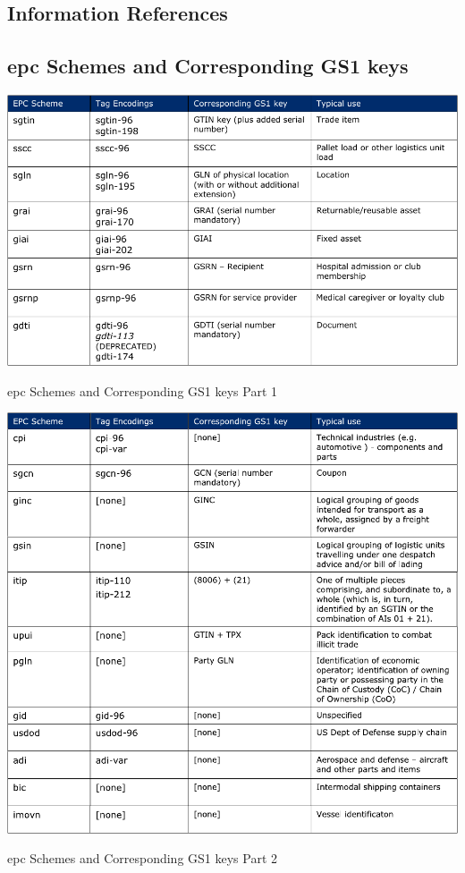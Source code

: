 \renewcommand{\thesection}{\Alph{section}}

\begin{appendices}
\chapter{Information References}

\section{\ac{epc} Schemes and Corresponding GS1 keys} \label{anx:epccodingschemes}
\begin{table}[!ht]
    \centering
    \includegraphics[width=\textwidth]{./figs/02-state-of-the-art/epcschemes.pdf}
    \caption[\ac{epc} Schemes and Corresponding GS1 keys Part 1]{\ac{epc} Schemes and Corresponding GS1 keys Part 1~\cite{EPCTagData}}
\end{table}

\begin{table}
    \centering
    \includegraphics[width=\textwidth]{./figs/02-state-of-the-art/epcschemes2.pdf}
    \caption[\ac{epc} Schemes and Corresponding GS1 keys Part 2]{\ac{epc} Schemes and Corresponding GS1 keys Part 2~\cite{EPCTagData}}
\end{table}


\end{appendices}
